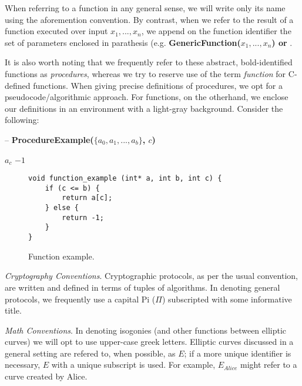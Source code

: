 When referring to a function in any general sense, we will write only its name using the aforemention convention. By contrast, when we refer to the result of a function executed over input $x_{1}, ..., x_{n}$, we append on the function identifier the set of parameters enclosed in parathesis (e.g. \textbf{GenericFunction($x_{1}, ..., x_{n}$) or }. 

It is also worth noting that we frequently refer to these abstract, bold-identified functions as \textit{procedures}, whereas we try to reserve use of the term \textit{function} for C-defined \sidh functions. When giving precise definitions of procedures, we opt for a pseudocode/algorithmic approach. For functions, on the otherhand, we enclose our definitions in an environment with a light-gray background. Consider the following: \\

\begin{algorithm}
\caption{-- \textbf{ProcedureExample($\{a_0, a_1, ... , a_b\}$, $c$)}}\label{alg:procedureexample}
\begin{algorithmic}[1]
	\State \Return $a_c$
\Else
	\State \Return $-1$
\EndIf
\end{algorithmic}
\end{algorithm}

\begin{figure}[!h]
\label{code:pbinv}
\begin{lstlisting}
void function_example (int* a, int b, int c) {
	if (c <= b) {
		return a[c];
	} else {
		return -1;
	}
}
\end{lstlisting}
\caption{Function example.}
\end{figure}

\noindent
\textit{Cryptography Conventions}. Cryptographic protocols, as per the usual convention, are written and defined in terms of tuples of algorithms. In denoting general protocols, we frequently use a capital Pi ($\Pi$) subscripted with some informative title.

\noindent
\textit{Math Conventions}. In denoting isogonies (and other functions between elliptic curves) we will opt to use upper-case greek letters. Elliptic curves discussed in a general setting are refered to, when possible, as $E$; if a more unique identifier is necessary, $E$ with a unique subscript is used. For example, $E_{Alice}$ might refer to a curve created by Alice.  


